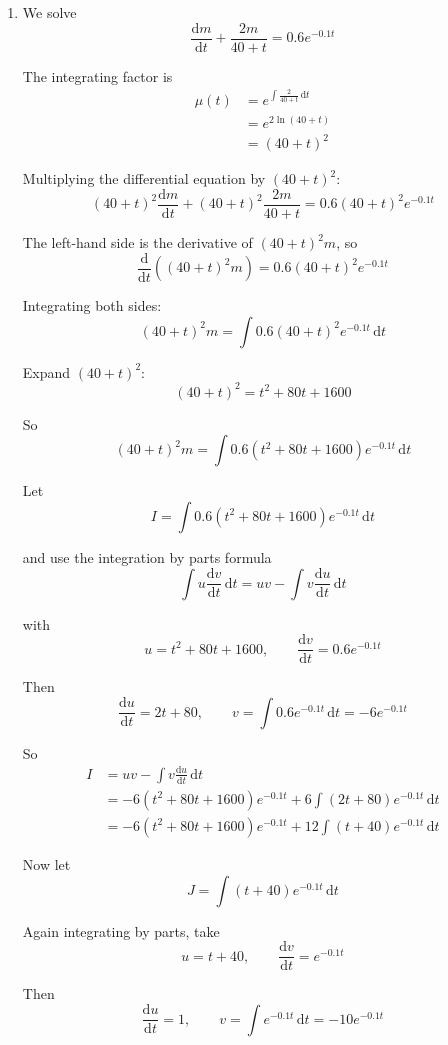 \documentclass[leqno]{article}
\begin{document}
\begin{enumerate}[
  label=\textbf{\arabic*.},
  leftmargin=*,
  topsep=0pt,
  partopsep=0pt,
  parsep=0pt
]
\begin{djsSolution}
\begin{enumerate}[label=\textbf{(\alph*)}]
So
\[
V(t)=4+0.1t \text{ litres}, \qquad \frac{\mathrm{d}m}{\mathrm{d}t}=0.6e^{-0.1t}-\frac{2m}{40+t}
\]

  \item We solve
\[
\frac{\mathrm{d}m}{\mathrm{d}t}+\frac{2m}{40+t}=0.6e^{-0.1t}
\]

The integrating factor is
\begin{align*}
\mu(t)
&=e^{\int \frac{2}{40+t}\,\mathrm{d}t} \\
&=e^{2\ln(40+t)} \\
&=(40+t)^2
\end{align*}

Multiplying the differential equation by \((40+t)^2\):
\[
(40+t)^2\frac{\mathrm{d}m}{\mathrm{d}t}+(40+t)^2\frac{2m}{40+t}=0.6(40+t)^2e^{-0.1t}
\]

The left-hand side is the derivative of \((40+t)^2m\), so
\[
\frac{\mathrm{d}}{\mathrm{d}t}\left((40+t)^2m\right)=0.6(40+t)^2e^{-0.1t}
\]

Integrating both sides:
\[
(40+t)^2m=\int 0.6(40+t)^2e^{-0.1t}\,\mathrm{d}t
\]

Expand \((40+t)^2\):
\[
(40+t)^2=t^2+80t+1600
\]

So
\[
(40+t)^2m=\int 0.6(t^2+80t+1600)e^{-0.1t}\,\mathrm{d}t
\]

Let
\[
I=\int 0.6(t^2+80t+1600)e^{-0.1t}\,\mathrm{d}t
\]

and use the integration by parts formula
\[
\int u\frac{\mathrm{d}v}{\mathrm{d}t}\,\mathrm{d}t=uv-\int v\frac{\mathrm{d}u}{\mathrm{d}t}\,\mathrm{d}t
\]

with
\[
u=t^2+80t+1600,
\qquad
\frac{\mathrm{d}v}{\mathrm{d}t}=0.6e^{-0.1t}
\]

Then
\[
\frac{\mathrm{d}u}{\mathrm{d}t}=2t+80,
\qquad
v=\int 0.6e^{-0.1t}\,\mathrm{d}t=-6e^{-0.1t}
\]

So
\begin{align*}
I
&=uv-\int v\frac{\mathrm{d}u}{\mathrm{d}t}\,\mathrm{d}t \\
&=-6(t^2+80t+1600)e^{-0.1t}
  +6\int (2t+80)e^{-0.1t}\,\mathrm{d}t \\
&=-6(t^2+80t+1600)e^{-0.1t}
  +12\int (t+40)e^{-0.1t}\,\mathrm{d}t
\end{align*}

Now let
\[
J=\int (t+40)e^{-0.1t}\,\mathrm{d}t
\]

Again integrating by parts, take
\[
u=t+40,
\qquad
\frac{\mathrm{d}v}{\mathrm{d}t}=e^{-0.1t}
\]

Then
\[
\frac{\mathrm{d}u}{\mathrm{d}t}=1,
\qquad
v=\int e^{-0.1t}\,\mathrm{d}t=-10e^{-0.1t}
\]


\end{enumerate}
\end{djsSolution}
\end{enumerate}
\end{document}
